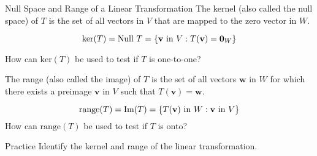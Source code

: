 \documentclass[xcolor=dvipsnames,aspectratio=169,t]{beamer}
\begin{document}
\begin{frame}{Null Space and Range of a Linear Transformation}
  \bbox
  The \alert{kernel} (also called the \alert{null space}) of $T$ is the set of all vectors in $V$ that are mapped to the zero vector in $W$.

  \[ \mbox{ker}(T) = \mbox{Null } T = \left\{ \mathbf{v} \mbox{ in } V : T(\mathbf{v}) = \mathbf{0}_W \right\} \]
  \ebox 

  How can $\text{ker}(T)$ be used to test if $T$ is \alert{one-to-one}?
  \ms

  \pause
  \bbox
  The \alert{range} (also called the \alert{image}) of $T$ is the set of all vectors $\mathbf{w}$ in $W$ for which there exists a preimage $\mathbf{v}$ in $V$ such that $T(\mathbf{v}) = \mathbf{w}$.

  \[ \mbox{range}(T) =  \mbox{Im}(T) = \left\{ T(\mathbf{v}) \mbox{ in } W: \mathbf{v} \mbox{ in } V \right\} \]
  \ebox 
  How can $\text{range}(T)$ be used to test if $T$ is \alert{onto}?
  \ms
\end{frame}


\begin{frame}{Practice}
  Identify the kernel and range of the linear transformation.
  \medskip

  


  
\end{frame}
\end{document}
